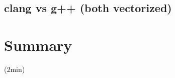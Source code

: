 \documentclass[12pt,titlepage]{article}
\begin{document}
    \subsection{clang vs g++ (both vectorized)}
\section{Summary} (2min)
\end{document}
